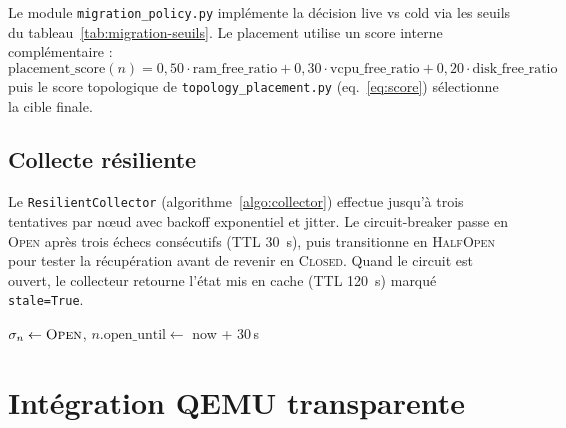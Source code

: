 Le module \texttt{migration\_policy.py} implémente la décision live vs cold via les seuils du tableau~\ref{tab:migration-seuils}. Le placement utilise un score interne complémentaire :
$$\text{placement\_score}(n) = 0{,}50 \cdot \text{ram\_free\_ratio} + 0{,}30 \cdot \text{vcpu\_free\_ratio} + 0{,}20 \cdot \text{disk\_free\_ratio}$$
puis le score topologique de \texttt{topology\_placement.py} (eq.~\ref{eq:score}) sélectionne la cible finale.

\subsection{Collecte résiliente}

Le \texttt{ResilientCollector} (algorithme~\ref{algo:collector}) effectue jusqu'à trois tentatives par nœud avec backoff exponentiel et jitter. Le circuit-breaker passe en \textsc{Open} après trois échecs consécutifs (TTL 30~s), puis transitionne en \textsc{HalfOpen} pour tester la récupération avant de revenir en \textsc{Closed}. Quand le circuit est ouvert, le collecteur retourne l'état mis en cache (TTL 120~s) marqué \texttt{stale=True}.

\begin{algorithm}[H]
\caption{Collecte d'un nœud avec circuit-breaker (\texttt{ResilientCollector::collect})}
\label{algo:collector}
$\sigma_n \gets \textsc{Open}$, $n.\text{open\_until} \gets$ now + 30\,s\;
\;
\end{algorithm}

\section{Intégration QEMU transparente}
\label{sec:impl-qemu}

